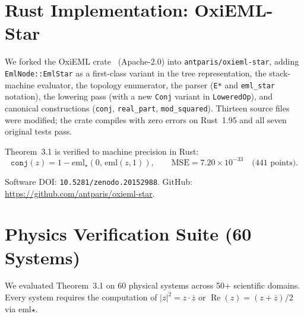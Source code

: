 \documentclass[11pt,a4paper]{article}
\begin{document}

\section{Rust Implementation: OxiEML-Star}
\label{sec:rust}

We forked the OxiEML crate~\cite{oxieml} (Apache-2.0) into \texttt{antparis/oxieml-star},
adding \texttt{EmlNode::EmlStar} as a first-class variant in the tree representation,
the stack-machine evaluator, the topology enumerator, the parser (\texttt{E*} and
\texttt{eml\_star} notation), the lowering pass (with a new \texttt{Conj} variant
in \texttt{LoweredOp}), and canonical constructions (\texttt{conj}, \texttt{real\_part},
\texttt{mod\_squared}).  Thirteen source files were modified; the crate compiles
with zero errors on Rust~1.95 and all seven original tests pass.

Theorem~3.1 is verified to machine precision in Rust:
\[
  \texttt{conj}(z) = 1 - \text{eml}_\star(0,\,\text{eml}(z,1)), \qquad
  \text{MSE} = 7.20 \times 10^{-33} \quad \text{(441 points)}.
\]

Software DOI: \texttt{10.5281/zenodo.20152988}.
GitHub: \url{https://github.com/antparis/oxieml-star}.

\section{Physics Verification Suite (60 Systems)}
\label{sec:physics}

We evaluated Theorem~3.1 on 60 physical systems across 50+ scientific domains.
Every system requires the computation of $|z|^2 = z \cdot \overline{z}$ or
$\operatorname{Re}(z) = (z + \overline{z})/2$ via eml$\star$.
\end{document}
